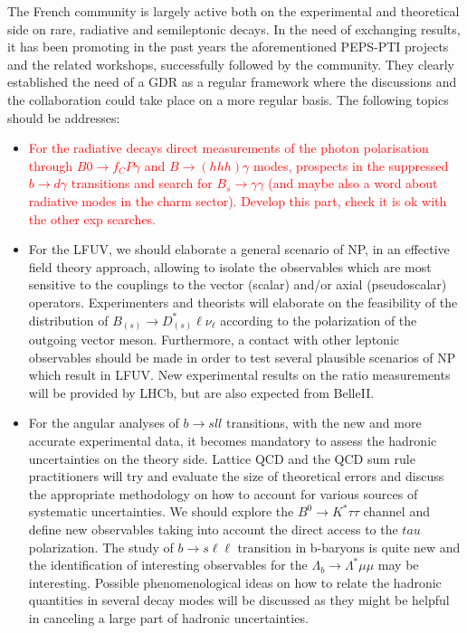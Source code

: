 The French community is largely active both on the experimental and theoretical side on rare, radiative and semileptonic decays.  In the need of exchanging results, it has been promoting in the past years the aforementioned PEPS-PTI projects and the related workshops, successfully followed by the community. They clearly established the need of a GDR as a regular framework  where the discussions and the collaboration could take place on a more regular basis. The following topics should be addresses:
\begin{itemize}
\item \textcolor{red}{For the radiative decays direct measurements of the photon polarisation through 
$B0 \to f_CP\gamma$ and $B \to(hhh)\gamma$ modes, prospects in the suppressed $b\to d\gamma$ transitions and search for $B_s\to \gamma \gamma$ (and maybe also a word about radiative modes in the charm sector). Develop this part, check it is ok with the other exp searches.}
\item For the LFUV, we should elaborate a general scenario of NP, in an effective field theory approach, allowing to isolate the  observables  which are most sensitive to the couplings to the vector (scalar) and/or axial (pseudoscalar) operators. Experimenters and theorists will elaborate on the feasibility of the distribution of $B_{(s)}\to D_{(s)}^\ast  \ell \nu_\ell$ according to the polarization of the outgoing vector meson. Furthermore, a contact with other leptonic observables should be made in order to test several plausible scenarios of NP which result in LFUV. New experimental results on the ratio measurements will be provided by LHCb, but are also expected from BelleII. 
\item For the angular analyses of $b \to sll$ transitions, with the new and more accurate experimental data, it becomes mandatory to assess the hadronic uncertainties on the theory side. Lattice QCD and the QCD sum rule practitioners will try and 
evaluate the size of theoretical errors and discuss the appropriate methodology on how to account for various sources of systematic uncertainties. We should explore the  $B^0\to K^\ast \tau\tau$ channel and define new observables taking into account the direct access to the $tau$ polarization. The study of $b \to s \ell \ell$ transition in b-baryons  is quite new and the identification of interesting observables for the $\Lambda_b \to \Lambda^\ast \mu\mu$ may be interesting.  
Possible phenomenological ideas on how to relate the hadronic quantities in several decay modes will be discussed as they might be helpful in canceling a large part of hadronic uncertainties.

\end{itemize}
